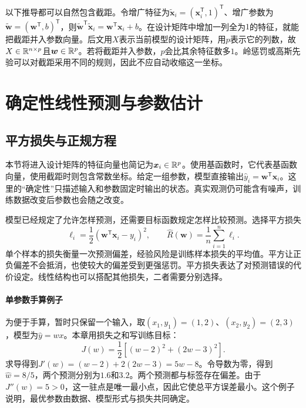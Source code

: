 以下推导都可以自然包含截距。令增广特征为$\tilde{\bm x}_i=(\bm x_i^{\mathsf T},1)^{\mathsf T}$、增广参数为$\tilde{\bm w}=(\bm w^{\mathsf T},b)^{\mathsf T}$，则$\tilde{\bm w}^{\mathsf T}\tilde{\bm x}_i=\bm w^{\mathsf T}\bm x_i+b$。在设计矩阵中增加一列全为$1$的特征，就能把截距并入参数向量。后文用$X$表示当前模型的设计矩阵，用$p$表示它的列数，故$X\in\mathbb{R}^{n\times p}$且$\bm w\in\mathbb{R}^p$。若将截距并入参数，$p$会比其余特征数多$1$。岭惩罚或高斯先验可以对截距采用不同的规则，因此不应自动收缩这一坐标。

\section{确定性线性预测与参数估计}
\subsection{平方损失与正规方程}
本节将进入设计矩阵的特征向量也简记为$\bm x_i\in\mathbb{R}^p$。使用基函数时，它代表基函数向量，使用截距时则包含常数坐标。给定一组参数，模型直接输出$\hat y_i=\bm w^{\mathsf T}\bm x_i$。这里的“确定性”只描述输入和参数固定时输出的状态。真实观测仍可能含有噪声，训练数据改变后参数也会随之改变。

模型已经规定了允许怎样预测，还需要目标函数规定怎样比较预测。选择平方损失
\begin{equation}
 \ell_i=\frac12(\bm w^{\mathsf T}\bm x_i-y_i)^2,
 \qquad \hat R(\bm w)=\frac1n\sum_{i=1}^n\ell_i.
\end{equation}
单个样本的损失衡量一次预测偏差，经验风险是训练样本损失的平均值。平方让正负偏差不会抵消，也使较大的偏差受到更强惩罚。平方损失表达了对预测错误的代价设定。线性结构也可以搭配其他损失，二者需要分别选择。

\paragraph{单参数手算例子}
为便于手算，暂时只保留一个输入，取$(x_1,y_1)=(1,2)$、$(x_2,y_2)=(2,3)$，模型为$\hat y=wx$。本章用损失之和写训练目标：
\begin{equation}
 J(w)=\frac12[(w-2)^2+(2w-3)^2].
\end{equation}
求导得到$J'(w)=(w-2)+2(2w-3)=5w-8$。令导数为零，得到$\hat w=8/5$，两个预测分别为$1.6$和$3.2$。两个预测都与标签存在偏差。由于$J''(w)=5>0$，这一驻点是唯一最小点，因此它使总平方误差最小。这个例子说明，最优参数由数据、模型形式与损失共同确定。

